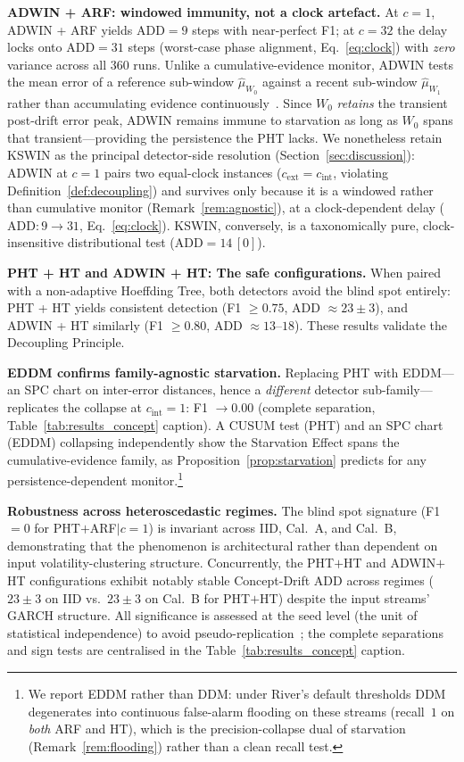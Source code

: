 \documentclass[10pt,conference]{IEEEtran}
\theoremstyle{definition}
\begin{document}
\textbf{ADWIN + ARF: windowed immunity, not a clock artefact.}
At $c = 1$, ADWIN + ARF yields $\mathrm{ADD} = 9$ steps with near-perfect F1; at $c = 32$ the delay locks onto $\mathrm{ADD} = 31$ steps (worst-case phase alignment, Eq.~\eqref{eq:clock}) with \emph{zero} variance across all 360 runs.
Unlike a cumulative-evidence monitor, ADWIN tests the mean error of a reference sub-window $\hat{\mu}_{W_0}$ against a recent sub-window $\hat{\mu}_{W_1}$ rather than accumulating evidence continuously~\cite{bifet_adwin_2007}.
Since $W_0$ \emph{retains} the transient post-drift error peak, ADWIN remains immune to starvation as long as $W_0$ spans that transient---providing the persistence the PHT lacks.
We nonetheless retain KSWIN as the principal detector-side resolution (Section~\ref{sec:discussion}): ADWIN at $c = 1$ pairs two equal-clock instances ($c_{\mathrm{ext}} = c_{\mathrm{int}}$, violating Definition~\ref{def:decoupling}) and survives only because it is a windowed rather than cumulative monitor (Remark~\ref{rem:agnostic}), at a clock-dependent delay ($\mathrm{ADD}: 9 \to 31$, Eq.~\eqref{eq:clock}). KSWIN, conversely, is a taxonomically pure, clock-insensitive distributional test ($\mathrm{ADD} = 14\,[0]$).

\textbf{PHT + HT and ADWIN + HT: The safe configurations.}
When paired with a non-adaptive Hoeffding Tree, both detectors avoid the blind spot entirely: PHT + HT yields consistent detection (F1 $\ge 0.75$, ADD $\approx 23 \pm 3$), and ADWIN + HT similarly (F1 $\ge 0.80$, ADD $\approx 13$--$18$).
These results validate the Decoupling Principle.

\textbf{EDDM confirms family-agnostic starvation.}
Replacing PHT with EDDM---an SPC chart on inter-error distances, hence a \emph{different} detector sub-family---replicates the collapse at $c_{\mathrm{int}} = 1$: F1 $\to 0.00$ (complete separation, Table~\ref{tab:results_concept} caption). A CUSUM test (PHT) and an SPC chart (EDDM) collapsing independently show the Starvation Effect spans the cumulative-evidence family, as Proposition~\ref{prop:starvation} predicts for any persistence-dependent monitor.\footnote{We report EDDM rather than DDM: under River's default thresholds DDM degenerates into continuous false-alarm flooding on these streams (recall~$1$ on \emph{both} ARF and HT), which is the precision-collapse dual of starvation (Remark~\ref{rem:flooding}) rather than a clean recall test.}

\textbf{Robustness across heteroscedastic regimes.}
The blind spot signature (F1${=}0$ for PHT$+$ARF$|c{=}1$) is invariant across IID, Cal.~A, and Cal.~B, demonstrating that the phenomenon is architectural rather than dependent on input volatility-clustering structure.
Concurrently, the PHT$+$HT and ADWIN$+$HT configurations exhibit notably stable Concept-Drift ADD across regimes ($23 \pm 3$ on IID vs.\ $23 \pm 3$ on Cal.~B for PHT$+$HT) despite the input streams' GARCH structure.
All significance is assessed at the seed level (the unit of statistical independence) to avoid pseudo-replication~\cite{demsar_statistical_2006}; the complete separations and sign tests are centralised in the Table~\ref{tab:results_concept} caption.
\end{document}
